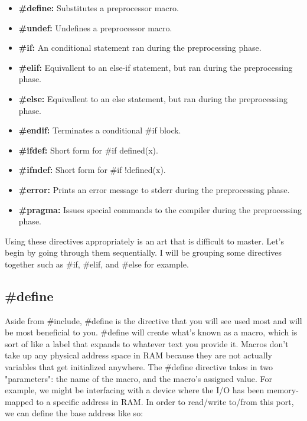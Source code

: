 \documentclass{article}
\begin{document}
\begin{itemize}
    \item{\textbf{\#define:} Substitutes a preprocessor macro.}

    \item{\textbf{\#undef:} Undefines a preprocessor macro.}

    \item{\textbf{\#if:} An conditional statement ran during the preprocessing phase.}

    \item{\textbf{\#elif:} Equivallent to an else-if statement, but ran during the preprocessing phase.}

    \item{\textbf{\#else:} Equivallent to an else statement, but ran during the preprocessing phase.}

    \item{\textbf{\#endif:} Terminates a conditional \#if block.}

    \item{\textbf{\#ifdef:} Short form for \#if defined(x).}

    \item{\textbf{\#ifndef:} Short form for \#if !defined(x).}

    \item{\textbf{\#error:} Prints an error message to stderr during the preprocessing phase.}

    \item{\textbf{\#pragma:} Issues special commands to the compiler during the preprocessing phase.}
\end{itemize}

Using these directives appropriately is an art that is difficult to master. Let’s begin by going through them
sequentially. I will be grouping some directives together such as \#if, \#elif, and \#else for example.

\subsection{\#define}

Aside from \#include, \#define is the directive that you will see used most and will be most beneficial to you.
\#define will create what’s known as a macro, which is sort of like a label that expands to whatever text you
provide it. Macros don’t take up any physical address space in RAM because they are not actually variables
that get initialized anywhere. The \#define directive takes in two "parameters": the name of the macro, and the
macro’s assigned value. For example, we might be interfacing with a device where the I/O has been
memory-mapped to a specific address in RAM. In order to read/write to/from this port, we can define the base
address like so:
\end{document}
